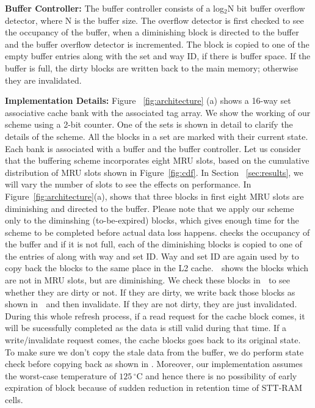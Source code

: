 \noindent\textbf{Buffer Controller:}
The buffer controller consists of a log$_2$N bit buffer overflow detector, where N is the buffer size.
The overflow detector is first checked to see the occupancy of the buffer,
when a diminishing block is directed to the buffer and the buffer overflow detector is incremented.
The block is copied to one of the empty buffer entries along with the set and way ID, if there is
buffer space.
If the buffer is full, the dirty blocks are written back to the main memory; otherwise they are  invalidated.

\noindent\textbf{Implementation Details:} Figure ~\ref{fig:architecture} (a) shows a 16-way set
associative cache bank with the associated tag array. We show the working of our scheme using a 2-bit
counter.  One of the sets is shown in detail to clarify the details of the scheme. All the blocks in
a set are marked with their current state. Each bank is  associated with a buffer and the buffer
controller. Let us consider that the buffering scheme incorporates eight MRU slots, based on the
cumulative distribution of MRU slots shown in Figure~\ref{fig:cdf}. In Section ~\ref{sec:results}, we
will vary the number of slots to see the effects on performance. In Figure~\ref{fig:architecture}(a),
 shows that three blocks in first eight MRU slots are diminishing and directed to the
buffer. Please note that we apply our scheme only to the diminshing (to-be-expired) blocks, which gives enough time for the scheme to be completed before actual data loss happens.  checks the occupancy of the buffer and if it is not full, each of the diminishing
blocks is copied to one of the entries of  along with way and set ID. Way and set ID are
again used by    to copy back the blocks to the same place in the L2 cache. 
\textcircled{\raisebox{-.9pt}{A}} shows the blocks which are not in MRU slots, but are diminishing.
We check these blocks in \textcircled{\raisebox{-.9pt}{B}} to see whether they are dirty or not. If
they are dirty, we write back those blocks as shown in \textcircled{\raisebox{-.9pt}{C}} and then 
invalidate.  If they are not dirty, they are just invalidated. During this whole refresh process, if a read request for the cache block comes, it will be sucessfully completed as the data is still valid during that time. If a write/invalidate request comes, the cache blocks goes back to its original state. To make sure we don't copy the stale data
from the buffer, we do perform state check before copying back as shown in . Moreover, our implementation assumes the worst-case temperature of $125\,^{\circ}\mathrm{C}$ and hence there is no possibility of early expiration of block because of sudden reduction in retention time of STT-RAM cells. 


